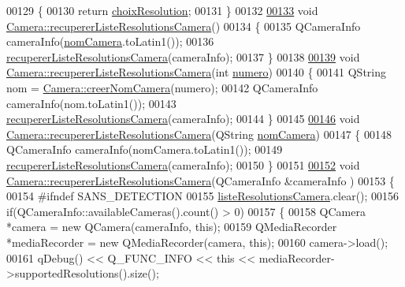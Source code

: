 \begin{DoxyCode}
00129 \{
00130     \textcolor{keywordflow}{return} \hyperlink{class_camera_a3fdddf6f548f04d7bdc26f32602a03d4}{choixResolution};
00131 \}
00132 
\hyperlink{class_camera_a97267488c5756b4217d4e1fbc68008fd}{00133} \textcolor{keywordtype}{void} \hyperlink{class_camera_a97267488c5756b4217d4e1fbc68008fd}{Camera::recupererListeResolutionsCamera}()
00134 \{
00135     QCameraInfo cameraInfo(\hyperlink{class_camera_ac1cdaf82921d2a2f3f941d867718eba2}{nomCamera}.toLatin1());
00136     \hyperlink{class_camera_a97267488c5756b4217d4e1fbc68008fd}{recupererListeResolutionsCamera}(cameraInfo);
00137 \}
00138 
\hyperlink{class_camera_acf7554fa133bab58c16192041254a1d6}{00139} \textcolor{keywordtype}{void} \hyperlink{class_camera_a97267488c5756b4217d4e1fbc68008fd}{Camera::recupererListeResolutionsCamera}(\textcolor{keywordtype}{int} 
      \hyperlink{class_camera_ae5cda5df3c9c49b88fff15389a1bbc64}{numero})
00140 \{
00141     QString nom = \hyperlink{class_camera_a506d459df95042a03894afd5b781c2aa}{Camera::creerNomCamera}(numero);
00142     QCameraInfo cameraInfo(nom.toLatin1());
00143     \hyperlink{class_camera_a97267488c5756b4217d4e1fbc68008fd}{recupererListeResolutionsCamera}(cameraInfo);
00144 \}
00145 
\hyperlink{class_camera_ae3d1ccb26bcd49340bc392dc1e7bb550}{00146} \textcolor{keywordtype}{void} \hyperlink{class_camera_a97267488c5756b4217d4e1fbc68008fd}{Camera::recupererListeResolutionsCamera}(QString 
      \hyperlink{class_camera_ac1cdaf82921d2a2f3f941d867718eba2}{nomCamera})
00147 \{
00148     QCameraInfo cameraInfo(nomCamera.toLatin1());
00149     \hyperlink{class_camera_a97267488c5756b4217d4e1fbc68008fd}{recupererListeResolutionsCamera}(cameraInfo);
00150 \}
00151 
\hyperlink{class_camera_a4a9f1bcfa19bbd5add6c758c8ad85b5c}{00152} \textcolor{keywordtype}{void} \hyperlink{class_camera_a97267488c5756b4217d4e1fbc68008fd}{Camera::recupererListeResolutionsCamera}(QCameraInfo &cameraInfo
      )
00153 \{
00154 \textcolor{preprocessor}{    #ifndef SANS\_DETECTION}
00155     \hyperlink{class_camera_a96af62eaf7828664865b56e7c69e771c}{listeResolutionsCamera}.clear();
00156     \textcolor{keywordflow}{if}(QCameraInfo::availableCameras().count() > 0)
00157     \{
00158         QCamera *camera = \textcolor{keyword}{new} QCamera(cameraInfo, \textcolor{keyword}{this});
00159         QMediaRecorder *mediaRecorder = \textcolor{keyword}{new} QMediaRecorder(camera, \textcolor{keyword}{this});
00160         camera->load();
00161         qDebug() << Q\_FUNC\_INFO << \textcolor{keyword}{this} << mediaRecorder->supportedResolutions().size();

\end{DoxyCode}
